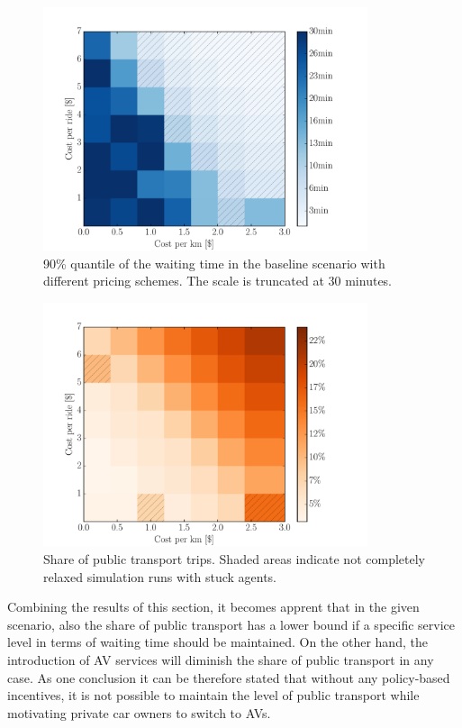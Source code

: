 \begin{figure}
    \centering
    \includegraphics[width=0.85\textwidth]{figures/waitingtimegrid.pdf}
    \caption{90\% quantile of the waiting time in the baseline scenario with different
    pricing schemes. The scale is truncated at 30 minutes.}
    \label{fig:waitingtimegrid}
\end{figure}

\begin{figure}
    \centering
    \includegraphics[width=0.85\textwidth]{figures/ptsharegrid.pdf}
    \caption{Share of public transport
    trips. Shaded areas indicate not completely relaxed simulation runs with stuck agents.}
    \label{fig:ptsharegrid}
\end{figure}

Combining the results of this section, it becomes apprent that in the given scenario,
also the share of public transport has a lower bound if a specific service level in
terms of waiting time should be maintained. On the other hand, the introduction of
AV services will diminish the share of public transport in any case. As one conclusion
it can be therefore stated that without any policy-based incentives, it is not possible
to maintain the level of public transport while motivating private car owners to switch to AVs.

